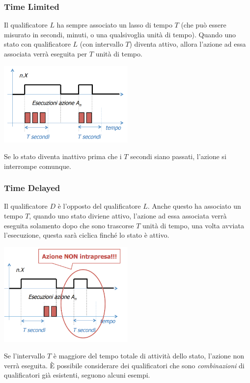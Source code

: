 \documentclass[10pt, letterpaper]{report}
\begin{document}
\subsubsection{Time Limited}
Il qualificatore $L$ ha sempre associato un lasso di tempo $T$ (che può essere misurato in secondi, minuti, o una qualsivoglia unità di tempo). Quando uno stato con qualificatore $L$ (con intervallo $T$) diventa attivo, allora l'azione ad essa associata verrà eseguita per $T$ unità di tempo.
\begin{center}
    \includegraphics[width=0.5\textwidth ]{images/LQual.png}
\end{center}
Se lo stato diventa inattivo prima che i $T$ secondi siano passati, l'azione si interrompe comunque.
\subsubsection{Time Delayed}
Il qualificatore $D$ è l'opposto del qualificatore $L$. Anche questo ha associato un tempo $T$, quando uno stato diviene attivo, l'azione ad essa associata verrà eseguita solamento dopo che sono trascorse $T$ unità di tempo, una volta avviata l'esecuzione, questa sarà ciclica finché lo stato è attivo. 
\begin{center}
    \includegraphics[width=0.5\textwidth ]{images/DelayedQual.png}
\end{center}
Se l'intervallo $T$ è maggiore del tempo totale di attività dello stato, l'azione non verrà eseguita.\acc 
È possibile considerare dei qualificatori che sono \textit{combinazioni} di qualificatori già esistenti, seguono alcuni esempi.
\end{document}
